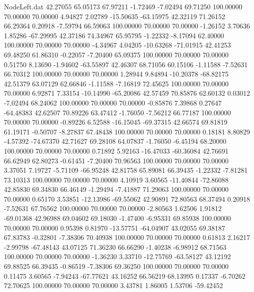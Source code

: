 \begin{filecontents}{NodeLeft.dat}
  42.27055   65.05173   67.97211    -1.72469   -7.02494   69.71250  100.00000   70.00000   70.00000    4.94827    2.02789  -15.50635  -63.15975
  42.32119   71.26152   66.29364     0.20918   -7.59794   66.59063  100.00000   70.00000   70.00000   -1.26152    3.70636    1.85286  -67.29995
  42.37186   74.34967   65.95795    -1.22332   -8.17094   62.40000  100.00000   70.00000   70.00000   -4.34967    4.04205  -10.63268  -71.01915
  42.41253   69.48250   61.86310    -0.22057   -7.20400   65.09375  100.00000   70.00000   70.00000    0.51750    8.13690   -1.94602  -63.55897
  42.46307   68.71056   60.15106    -1.11588   -7.52631   66.70312  100.00000   70.00000   70.00000    1.28944    9.84894  -10.20378  -68.82175
  42.51379   63.07129   62.66846    -1.11588   -7.16819   72.45625  100.00000   70.00000   70.00000    6.92871    7.33154  -10.14990  -65.20086
  42.57459   70.85876   62.60132     0.03012   -7.02494   68.24062  100.00000   70.00000   70.00000   -0.85876    7.39868    0.27647  -64.48383
  42.62507   70.89226   63.47412    -1.76050   -7.56212   66.77187  100.00000   70.00000   70.00000   -0.89226    6.52588  -16.15045  -69.37315
  42.66574   69.81819   61.19171    -0.50707   -8.27837   67.48438  100.00000   70.00000   70.00000    0.18181    8.80829   -4.57392  -74.67370
  42.71627   69.28108   64.07837    -1.76050   -6.45194   68.20000  100.00000   70.00000   70.00000    0.71892    5.92163  -16.47033  -60.36084
  42.76691   66.62949   62.80273    -0.61451   -7.20400   70.96563  100.00000   70.00000   70.00000    3.37051    7.19727   -5.71109  -66.95248
  42.81758   65.89081   66.39435    -1.22332   -7.81281   73.10313  100.00000   70.00000   70.00000    4.10919    3.60565  -11.40844  -72.86088
  42.85830   69.34830   66.46149    -1.29494   -7.41887   71.29063  100.00000   70.00000   70.00000    0.65170    3.53851  -12.13986  -69.55062
  42.90891   72.80563   68.37494     0.20918   -7.52631   67.76562  100.00000   70.00000   70.00000   -2.80563    1.62506    1.91812  -69.01368
  42.96988   69.04602   69.18030    -1.47400   -6.95331   69.85938  100.00000   70.00000   70.00000    0.95398    0.81970  -13.57751  -64.04907
  43.02055   69.38187   67.83783    -0.32801   -7.38306   70.40938  100.00000   70.00000   70.00000    0.61813    2.16217   -2.99798  -67.48143
  43.07125   71.36230   66.66290    -1.40238   -6.98912   68.71563  100.00000   70.00000   70.00000   -1.36230    3.33710  -12.75769  -63.58127
  43.12192   69.88525   66.39435    -0.86519   -7.38306   69.36250  100.00000   70.00000   70.00000    0.11475    3.60565   -7.94243  -67.77621
  43.16252   66.56219   68.13995     0.17337   -6.70262   72.70625  100.00000   70.00000   70.00000    3.43781    1.86005    1.53706  -59.42452

\end{filecontents}

